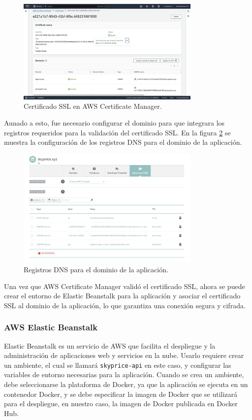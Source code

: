 \begin{figure}[H]
    \centering
    \includegraphics[width=0.8\textwidth]{imagenes/05-implementacion/despliegue/aws-certificate-manager.png}
    \caption{Certificado SSL en AWS Certificate Manager.}
    \label{fig:certificado-ssl}
\end{figure}

Aunado a esto, fue necesario configurar el dominio para que integrara los registros
requeridos para la validación del certificado SSL. En la figura \ref{fig:registros-dns}
se muestra la configuración de los registros DNS para el dominio de la aplicación.

\begin{figure}[H]
    \centering
    \includegraphics[width=0.8\textwidth]{imagenes/05-implementacion/despliegue/namecheapadvanceddns.png}
    \caption{Registros DNS para el dominio de la aplicación.}
    \label{fig:registros-dns}
\end{figure}

Una vez que AWS Certificate Manager validó el certificado SSL, ahora se puede
crear el entorno de Elastic Beanstalk para la aplicación y asociar el certificado
SSL al dominio de la aplicación, lo que garantiza una conexión segura y cifrada.

\subsubsection{AWS Elastic Beanstalk}
Elastic Beanstalk es un servicio de AWS que facilita el despliegue y la administración
de aplicaciones web y servicios en la nube. Usarlo requiere crear un ambiente,
el cual se llamará \texttt{skyprice-api} en este caso, y configurar las variables
de entorno necesarias para la aplicación. Cuando se crea un ambiente, debe seleccionarse
la plataforma de Docker, ya que la aplicación se ejecuta en un contenedor Docker,
y se debe especificar la imagen de Docker que se utilizará para el despliegue,
en nuestro caso, la imagen de Docker publicada en Docker Hub.

